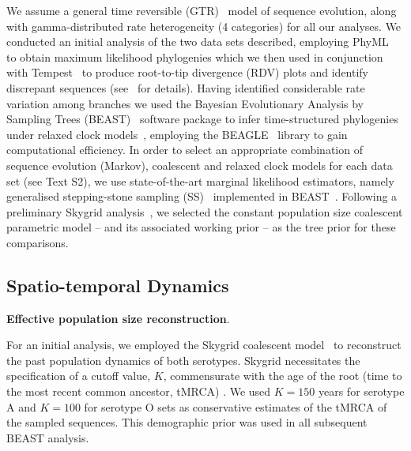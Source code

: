 \documentclass[10pt]{article}
\begin{document}
We assume a general time reversible (GTR)~\citep{Tavare1986} model of sequence evolution, along with gamma-distributed rate heterogeneity (4 categories) for all our analyses.
We conducted an initial analysis of the two data sets described, employing PhyML~\citep{Guindon2003} to obtain maximum likelihood phylogenies which we then used in conjunction with Tempest~\citep{Rambaut2016} to produce root-to-tip divergence (RDV) plots and identify discrepant sequences (see~\cite{Rambaut2016} for details).
Having identified considerable rate variation among branches we used the Bayesian Evolutionary Analysis by Sampling Trees (BEAST)~\citep{Suchard2018} software package to infer time-structured phylogenies under relaxed clock models~\citep{Drummond2006}, employing the BEAGLE~\citep{Ayres2012,Ayres2019} library to gain computational efficiency. %
In order to select an appropriate combination of sequence evolution (Markov), coalescent and relaxed clock models for each data set (see Text S2), we use state-of-the-art marginal likelihood estimators, namely generalised stepping-stone sampling (SS)~\citep{Baele2016} %
implemented in BEAST~\citep{Suchard2018}.
Following a preliminary Skygrid analysis~\citep{Gill2013}, we selected the constant population size coalescent parametric model -- and its associated working prior -- as the tree prior for these comparisons.

\subsection*{Spatio-temporal Dynamics}

\textbf{Effective population size reconstruction}.

For an initial analysis, we employed the Skygrid coalescent model~\citep{Gill2013,Hill2019} %
 to reconstruct the past population dynamics of both serotypes.
Skygrid necessitates the specification of a cutoff value, $K$, commensurate with the age of the root (time to the most recent common ancestor, tMRCA) .
We used $K = 150$ years for serotype A and $K = 100$ for serotype O sets as conservative estimates of the tMRCA of the sampled sequences. 
This demographic prior was used in all subsequent BEAST analysis.
\end{document}
